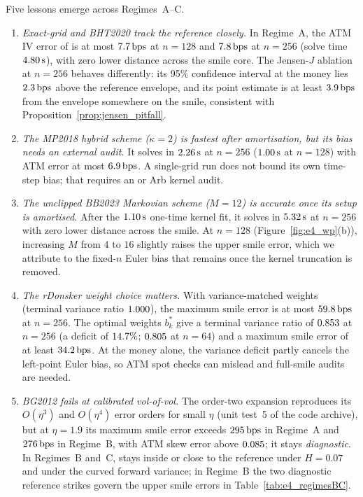 Five lessons emerge across Regimes~A--C.
\begin{enumerate}[1.]
  \item \emph{Exact-grid \RCCE{} and BHT2020 track the reference closely.} In Regime~A, the ATM IV error of \RCCE{} is at most $7.7\,\mathrm{bps}$ at $n=128$ and $7.8\,\mathrm{bps}$ at $n=256$ (solve time $4.80\,\mathrm{s}$), with zero lower distance across the smile core. The Jensen-$J$ ablation at $n=256$ behaves differently: its 95\% confidence interval at the money lies $2.3\,\mathrm{bps}$ above the reference envelope, and its point estimate is at least $3.9\,\mathrm{bps}$ from the envelope somewhere on the smile, consistent with Proposition~\ref{prop:jensen_pitfall}.
  \item \emph{The MP2018 hybrid scheme ($\kappa=2$) is fastest after amortisation, but its bias needs an external audit.} It solves in $2.26\,\mathrm{s}$ at $n=256$ ($1.00\,\mathrm{s}$ at $n=128$) with ATM error at most $6.9\,\mathrm{bps}$. A single-grid run does not bound its own time-step bias; that requires an \RCBridge{} or Arb kernel audit.
  \item \emph{The unclipped BB2023 Markovian scheme ($M=12$) is accurate once its setup is amortised.} After the $1.10\,\mathrm{s}$ one-time kernel fit, it solves in $5.32\,\mathrm{s}$ at $n=256$ with zero lower distance across the smile. At $n=128$ (Figure~\ref{fig:e4_wp}(b)), increasing $M$ from $4$ to $16$ slightly raises the upper smile error, which we attribute to the fixed-$n$ Euler bias that remains once the kernel truncation is removed.
  \item \emph{The rDonsker weight choice matters.} With variance-matched weights (terminal variance ratio $1.000$), the maximum smile error is at most $59.8\,\mathrm{bps}$ at $n=256$. The optimal weights $b_k^*$ give a terminal variance ratio of $0.853$ at $n=256$ (a deficit of $14.7\%$; $0.805$ at $n=64$) and a maximum smile error of at least $34.2\,\mathrm{bps}$. At the money alone, the variance deficit partly cancels the left-point Euler bias, so ATM spot checks can mislead and full-smile audits are needed.
  \item \emph{BG2012 fails at calibrated vol-of-vol.} The order-two expansion reproduces its $O(\eta^3)$ and $O(\eta^4)$ error orders for small $\eta$ (unit test~5 of the code archive), but at $\eta=1.9$ its maximum smile error exceeds $295\,\mathrm{bps}$ in Regime~A and $276\,\mathrm{bps}$ in Regime~B, with ATM skew error above $0.085$; it stays \emph{diagnostic}. In Regimes~B and~C, \RCCE{} stays inside or close to the reference under $H=0.07$ and under the curved forward variance; in Regime~B the two diagnostic reference strikes govern the upper smile errors in Table~\ref{tab:e4_regimesBC}.
\end{enumerate}

